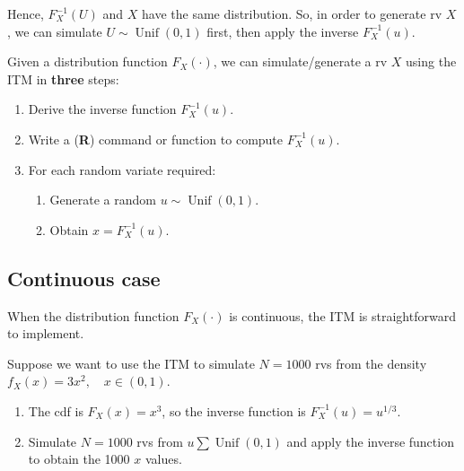 \documentclass[
  letterpaper,
  DIV=11,
  numbers=noendperiod]{scrreprt}
\providecommand{\tightlist}{%
  \setlength{\itemsep}{0pt}\setlength{\parskip}{0pt}}
\begin{document}
Hence, \(F_X^{-1}(U)\) and \(X\) have the same distribution. So, in
order to generate rv \(X\), we can simulate
\(U\sim \operatorname{Unif}(0,1)\) first, then apply the inverse
\(F_X^{-1}(u)\).

\begin{tcolorbox}[enhanced jigsaw, colback=white, bottomtitle=1mm, breakable, arc=.35mm, colbacktitle=quarto-callout-note-color!10!white, colframe=quarto-callout-note-color-frame, titlerule=0mm, toptitle=1mm, leftrule=.75mm, bottomrule=.15mm, opacitybacktitle=0.6, left=2mm, toprule=.15mm, coltitle=black, rightrule=.15mm, title=\textcolor{quarto-callout-note-color}{\faInfo}\hspace{0.5em}{Procedure with inverse transformation method}, opacityback=0]

Given a distribution function \(F_X(\cdot)\), we can simulate/generate a
rv \(X\) using the ITM in \textbf{three} steps:

\begin{enumerate}
\def\labelenumi{\arabic{enumi}.}
\item
  Derive the inverse function \(F_X^{-1}(u)\).
\item
  Write a (\textbf{R}) command or function to compute \(F_X^{-1}(u)\).
\item
  For each random variate required:

  \begin{enumerate}
  \def\labelenumii{\roman{enumii})}
  \tightlist
  \item
    Generate a random \(u\sim \operatorname{Unif}(0,1)\).
  \item
    Obtain \(x = F_X^{-1}(u)\).
  \end{enumerate}
\end{enumerate}

\end{tcolorbox}

\subsection{Continuous case}\label{continuous-case}

When the distribution function \(F_X(\cdot)\) is continuous, the ITM is
straightforward to implement.

Suppose we want to use the ITM to simulate \(N=1000\) rvs from the
density \(f_X(x)=3x^2,\quad x\in(0,1)\).

\begin{enumerate}
\def\labelenumi{\arabic{enumi}.}
\item
  The cdf is \(F_X(x)=x^3\), so the inverse function is
  \(F_X^{-1}(u)=u^{1/3}\).
\item
  Simulate \(N=1000\) rvs from \(u\sum \operatorname{Unif}(0,1)\) and
  apply the inverse function to obtain the 1000 \(x\) values.
\end{enumerate}
\end{document}
